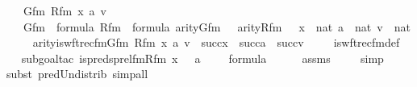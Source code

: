 \begin{isabellebody}
\ \ \ Gfm\ Rfm\ x\ a\ v\ \isanewline
\ \ \ {\isachardoublequoteopen}Gfm\ {\isasymin}\ formula{\isachardoublequoteclose}\ {\isachardoublequoteopen}Rfm\ {\isasymin}\ formula{\isachardoublequoteclose}\ {\isachardoublequoteopen}arity{\isacharparenleft}{\kern0pt}Gfm{\isacharparenright}{\kern0pt}\ {\isasymle}\ {}{\isachardoublequoteclose}\ {\isachardoublequoteopen}arity{\isacharparenleft}{\kern0pt}Rfm{\isacharparenright}{\kern0pt}\ {\isacharequal}{\kern0pt}\ {}{\isachardoublequoteclose}\ {\isachardoublequoteopen}x\ {\isasymin}\ nat{\isachardoublequoteclose}\ {\isachardoublequoteopen}a\ {\isasymin}\ nat{\isachardoublequoteclose}\ {\isachardoublequoteopen}v\ {\isasymin}\ nat{\isachardoublequoteclose}\ \isanewline
\ \ \ {\isachardoublequoteopen}arity{\isacharparenleft}{\kern0pt}is{\isacharunderscore}{\kern0pt}wftrec{\isacharunderscore}{\kern0pt}fm{\isacharparenleft}{\kern0pt}Gfm{\isacharcomma}{\kern0pt}\ Rfm{\isacharcomma}{\kern0pt}\ x{\isacharcomma}{\kern0pt}\ a{\isacharcomma}{\kern0pt}\ v{\isacharparenright}{\kern0pt}{\isacharparenright}{\kern0pt}\ {\isasymle}\ succ{\isacharparenleft}{\kern0pt}x{\isacharparenright}{\kern0pt}\ {\isasymunion}\ succ{\isacharparenleft}{\kern0pt}a{\isacharparenright}{\kern0pt}\ {\isasymunion}\ succ{\isacharparenleft}{\kern0pt}v{\isacharparenright}{\kern0pt}{\isachardoublequoteclose}\ \isanewline
%
\isadelimproof
\isanewline
\ \ %
\endisadelimproof
%
\isatagproof
{}\isamarkupfalse%
\ is{\isacharunderscore}{\kern0pt}wftrec{\isacharunderscore}{\kern0pt}fm{\isacharunderscore}{\kern0pt}def\ \isanewline
\ \ \isamarkupfalse%
{\isacharparenleft}{\kern0pt}subgoal{\isacharunderscore}{\kern0pt}tac\ {\isachardoublequoteopen}is{\isacharunderscore}{\kern0pt}preds{\isacharunderscore}{\kern0pt}prel{\isacharunderscore}{\kern0pt}fm{\isacharparenleft}{\kern0pt}Rfm{\isacharcomma}{\kern0pt}\ x\ {\isacharhash}{\kern0pt}{\isacharplus}{\kern0pt}\ {}{\isacharcomma}{\kern0pt}\ a\ {\isacharhash}{\kern0pt}{\isacharplus}{\kern0pt}\ {}{\isacharcomma}{\kern0pt}\ {}{\isacharparenright}{\kern0pt}\ {\isasymin}\ formula{\isachardoublequoteclose}{\isacharparenright}{\kern0pt}\ \ \isanewline
\ \ \isamarkupfalse%
\ assms\isanewline
\ \ \ \isamarkupfalse%
\ simp\isanewline
\ \ \ \isamarkupfalse%
{\isacharparenleft}{\kern0pt}subst\ pred{\isacharunderscore}{\kern0pt}Un{\isacharunderscore}{\kern0pt}distrib{\isacharcomma}{\kern0pt}\ simp{\isacharunderscore}{\kern0pt}all{\isacharparenright}{\kern0pt}{\isacharplus}{\kern0pt}\isanewline

\end{isabellebody}
